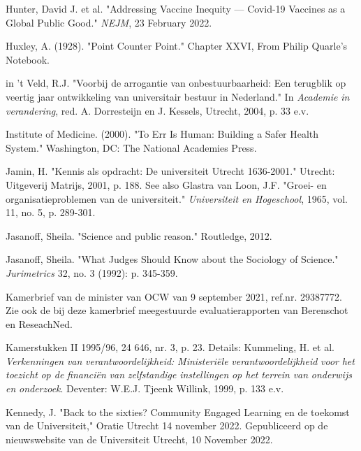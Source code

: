 \documentclass[smallauthor, chapterhaspagenum, nochapterinheader, pagenuminheader,  bigchapnum,medium2, tocpages,  garamond, titleinheader]{jote-book}
\begin{document}
\begin{references}
		Hunter, David J. et al. "Addressing Vaccine Inequity — Covid-19 Vaccines as a Global Public Good." \emph{NEJM}, 23 February 2022.



		Huxley, A. (1928). "Point Counter Point." Chapter XXVI, From Philip Quarle's Notebook.



		in 't Veld, R.J. "Voorbij de arrogantie van onbestuurbaarheid: Een terugblik op veertig jaar ontwikkeling van universitair bestuur in Nederland." In \emph{Academie}\emph{ in }\emph{verandering}, red. A. Dorresteijn en J. Kessels, Utrecht, 2004, p. 33 e.v.



		Institute of Medicine. (2000). "To Err Is Human: Building a Safer Health System." Washington, DC: The National Academies Press.



		Jamin, H. "Kennis als opdracht: De universiteit Utrecht 1636-2001." Utrecht: Uitgeverij Matrijs, 2001, p. 188. See also Glastra van Loon, J.F. "Groei- en organisatieproblemen van de universiteit." \emph{Universiteit }\emph{en}\emph{ }\emph{Hogeschool}, 1965, vol. 11, no. 5, p. 289-301.



		Jasanoff, Sheila. "Science and public reason." Routledge, 2012.



		Jasanoff, Sheila. "What Judges Should Know about the Sociology of Science." \emph{Jurimetrics} 32, no. 3 (1992): p. 345-359.



		Kamerbrief van de minister van OCW van 9 september 2021, ref.nr. 29387772. Zie ook de bij deze kamerbrief meegestuurde evaluatierapporten van Berenschot en ReseachNed.



		Kamerstukken II 1995/96, 24 646, nr. 3, p. 23. Details: Kummeling, H. et al. \emph{Verkenningen}\emph{ van }\emph{verantwoordelijkheid}\emph{: }\emph{Ministeriële}\emph{ }\emph{verantwoordelijkheid}\emph{ }\emph{voor}\emph{ het }\emph{toezicht}\emph{ op de }\emph{financiën}\emph{ van }\emph{zelfstandige}\emph{ }\emph{instellingen}\emph{ op het }\emph{terrein}\emph{ van }\emph{onderwijs}\emph{ }\emph{en}\emph{ }\emph{onderzoek}. Deventer: W.E.J. Tjeenk Willink, 1999, p. 133 e.v.



		Kennedy, J. "Back to the sixties? Community Engaged Learning en de toekomst van de Universiteit," Oratie Utrecht 14 november 2022. Gepubliceerd op de nieuwswebsite van de Universiteit Utrecht, 10 November 2022.




\end{references}
\end{document}
